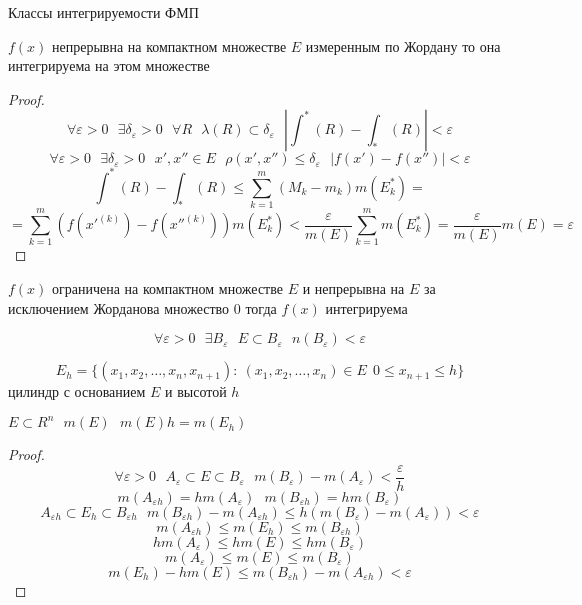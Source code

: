 \begin{title}[\Large]
  Классы интегрируемости ФМП
\end{title}

\begin{theorem}
  $f(x)$ непрерывна на компактном множестве $E$ измеренным по Жордану то она
  интегрируема на этом множестве
\end{theorem}

\begin{proof}
  $$
  \forall \varepsilon > 0 ~~~ \exists \delta_{\varepsilon} > 0 ~~~ \forall R
  ~~~  \lambda(R) \subset \delta_{\varepsilon} ~~~
  \left| \int^*(R) - \int_*(R) \right| < \varepsilon
  $$
  $$
  \forall \varepsilon > 0 ~~~ \exists \delta_{\varepsilon} > 0 ~~~
  x', x'' \in E ~~~ \rho (x', x'') \le \delta_{\varepsilon} ~~~
  |f(x') - f(x'')| < \varepsilon
  $$
  $$
  \int^*(R) - \int_*(R) \le \sum_{k=1}^m(M_k - m_k)m(E_k^*) =
  $$
  $$
  = \sum_{k=1}^m (f(x'^{(k)}) - f(x''^{(k)}))m(E_k^*) < \frac{\varepsilon}{m(E)}
  \sum_{k=1}^m m(E_k^*) = \frac{\varepsilon}{m(E)} m(E) = \varepsilon
  $$
\end{proof}

\begin{theorem}
  $f(x)$ ограничена на компактном множестве $E$ и непрерывна на $E$ за
  исключением Жорданова множество 0 тогда $f(x)$ интегрируема
\end{theorem}

\begin{define}
  $$
  \forall \varepsilon > 0 ~~~ \exists B_{\varepsilon} ~~~ E \subset
  B_{\varepsilon} ~~~ n(B_{\varepsilon}) < \varepsilon
  $$
\end{define}

\begin{define}
  $$
  E_h = \{ (x_1, x_2, \ldots, x_n, x_{n+1}): ~ (x_1, x_2, \ldots, x_n) \in E
  ~~ 0 \le x_{n+1} \le h\}
  $$
  цилиндр с основанием $E$ и высотой $h$
\end{define}

\begin{block}[Лемма]
  $E \subset R^n ~~~ m(E) ~~~ m(E)h = m(E_h)$
\end{block}

\begin{proof}
  $$
  \forall \varepsilon > 0 ~~~ A_{\varepsilon} \subset E \subset B_{\varepsilon}
  ~~~ m(B_{\varepsilon}) - m(A_{\varepsilon}) < \frac{\varepsilon}{h}
  $$
  $$
  m(A_{\varepsilon h}) = hm(A_{\varepsilon}) ~~~ m(B_{\varepsilon h}) =
  hm(B_{\varepsilon})
  $$
  $$
  A_{\varepsilon h} \subset E_h \subset B_{\varepsilon h} ~~~
  m(B_{\varepsilon h}) - m(A_{\varepsilon h}) \le h(m(B_{\varepsilon}) -
  m(A_{\varepsilon})) < \varepsilon
  $$
  $$
  m(A_{\varepsilon h}) \le m(E_h) \le m(B_{\varepsilon h})
  $$
  $$
  hm(A_{\varepsilon}) \le hm(E) \le hm(B_{\varepsilon})
  $$
  $$
  m(A_{\varepsilon}) \le m(E) \le m(B_{\varepsilon})
  $$
  $$
  m(E_h) - hm(E) \le m(B_{\varepsilon h}) - m(A_{\varepsilon h}) < \varepsilon
  $$
\end{proof}

